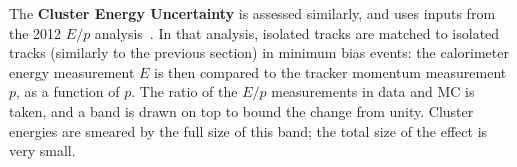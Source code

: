 	The \textbf{Cluster Energy Uncertainty} is assessed similarly, and uses inputs from the 2012 $E/p$ analysis~\cite{ATL-PHYS-PUB-2014-002}. In that analysis, isolated tracks are matched to isolated tracks (similarly to the previous section) in minimum bias events: the calorimeter energy measurement $E$ is then compared to the tracker momentum measurement $p$, as a function of $p$. The ratio of the $E/p$ measurements in data and MC is taken, and a band is drawn on top to bound the change from unity. 	Cluster energies are smeared by the full size of this band; the total size of the effect is very small.






